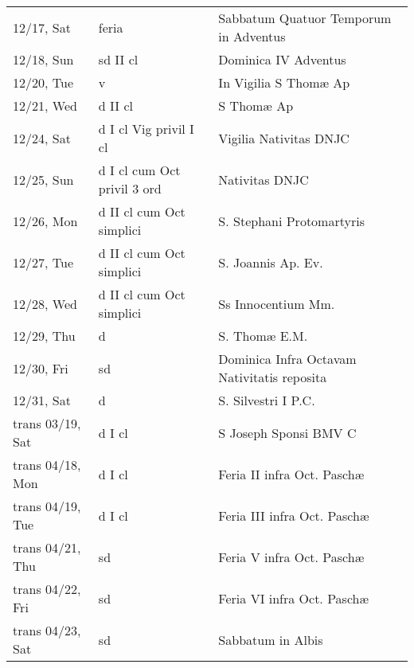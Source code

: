\documentclass{article}
\begin{document}
\begin{longtable}{ l l l }
12/17, Sat & feria & Sabbatum Quatuor Temporum in Adventus\\
12/18, Sun & sd II cl & Dominica IV Adventus\\
12/20, Tue & v & In Vigilia S Thomæ Ap\\
12/21, Wed & d II cl & S Thomæ Ap\\
12/24, Sat & d I cl Vig privil I cl & Vigilia Nativitas DNJC\\
12/25, Sun & d I cl cum Oct privil 3 ord & Nativitas DNJC\\
12/26, Mon & d II cl cum Oct simplici & S. Stephani Protomartyris\\
12/27, Tue & d II cl cum Oct simplici & S. Joannis Ap. Ev.\\
12/28, Wed & d II cl cum Oct simplici & Ss Innocentium Mm.\\
12/29, Thu & d & S. Thomæ E.M.\\
12/30, Fri & sd & Dominica Infra Octavam Nativitatis reposita\\
12/31, Sat & d & S. Silvestri I P.C.\\
trans 03/19, Sat & d I cl & S Joseph Sponsi BMV C\\
trans 04/18, Mon & d I cl & Feria II infra Oct. Paschæ\\
trans 04/19, Tue & d I cl & Feria III infra Oct. Paschæ\\
trans 04/21, Thu & sd & Feria V infra Oct. Paschæ\\
trans 04/22, Fri & sd & Feria VI infra Oct. Paschæ\\
trans 04/23, Sat & sd & Sabbatum in Albis\\
\end{longtable}
\end{document}
